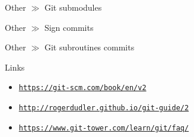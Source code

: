 \documentclass[10pt]{beamer}
\newcommand{\urlCustom}[1]{\href{https://#1}{\textcolor{greyCustom}{\texttt{#1}}}}
\begin{document}
\begin{frame}{Other $\gg$ Git submodules}
\end{frame}

\begin{frame}{Other $\gg$ Sign commits}
\end{frame}

\begin{frame}{Other $\gg$ Git subroutines commits}
\end{frame}


\begin{frame}{Links}

\begin{itemize}
\item\urlCustom{https://git-scm.com/book/en/v2}
\item\urlCustom{http://rogerdudler.github.io/git-guide/2}
\item\urlCustom{https://www.git-tower.com/learn/git/faq/}
\end{itemize}

\begin{center}\doclicenseThis\end{center}

\end{frame}
\end{document}
